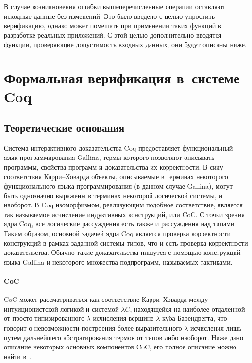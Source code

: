 В случае возникновения ошибки вышеперечисленные операции оставляют исходные данные без изменений. Это было введено с целью упростить верификацию, однако может помешать при применении таких функций в разработке реальных приложений. С этой целью дополнительно вводятся функции, проверяющие допустимость входных данных, они будут описаны ниже.

\section{Формальная верификация в~системе Coq}

\subsection{Теоретические основания}

Система интерактивного доказательства Coq предоставляет функциональный язык программирования Gallina, термы которого позволяют описывать программы, свойства программ и доказательства их корректности. В силу соответствия Карри--Ховарда объекты, описываемые в терминах некоторого функционального языка программирования (в данном случае Gallina), могут быть однозначно выражены в терминах некоторой логической системы, и наоборот. В Coq изоморфизмом, реализующим подобное соответствие, является так называемое исчисление индуктивных конструкций, или CoC. С точки зрения ядра Coq, все логические рассуждения есть также и рассуждения над типами. Таким образом, основной задачей ядра Coq является проверка корректности конструкций в рамках заданной системы типов, что и есть проверка корректности доказательства. Обычно такие доказательства пишутся с помощью конструкций языка Gallina и некоторого множества подпрограмм, называемых тактиками.

\paragraph{CoC} CoC может рассматриваться как соответствие Карри--Ховарда между интуиционистской логикой и системой $\lambda C$, находящейся на наиболее отдаленной от просто типизированного $\lambda$-исчисления вершине $\lambda$-куба Барендрегта, что говорит о невозможности построения более выразительного $\lambda$-исчисления лишь путем дальнейшего абстрагирования термов от типов либо наоборот. Ниже дано описание некоторых основных компонентов CoC, его полное описание можно найти в~\autocite{CoqManual}.


